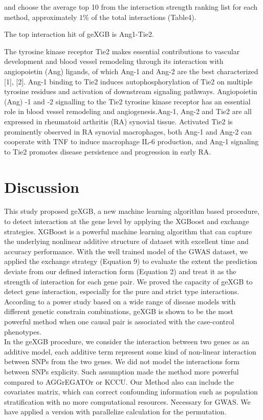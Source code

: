 \documentclass[11pt]{article}
\theoremstyle{plain}
\theoremstyle{definition}
\theoremstyle{remark}
\begin{document}
and choose the average top 10 from the interaction strength ranking list for each method, approximately $1\%$ of the total interactions (Table4).

The top interaction hit of geXGB is Ang1-Tie2.

The tyrosine kinase receptor Tie2 makes essential contributions to vascular development and blood vessel remodeling through its interaction with angiopoietin (Ang) ligands, of which Ang-1 and Ang-2 are the best characterized [1], [2]. Ang-1 binding to Tie2 induces autophosphorylation of Tie2 on multiple tyrosine residues and activation of downstream signaling pathways.
Angiopoietin (Ang) -1 and -2 signalling to the Tie2 tyrosine kinase receptor has an essential role in blood vessel remodeling and angiogenesis.Ang-1, Ang-2 and Tie2 are all expressed in rheumatoid arthritis (RA) synovial tissue. Activated Tie2 is prominently observed in RA synovial macrophages, both Ang-1 and Ang-2 can cooperate with TNF to induce macrophage IL-6 production, and Ang-1 signaling to Tie2 promotes disease persistence and progression in early RA.



\section{Discussion}

This study proposed geXGB, a new machine learning algorithm based procedure, to detect interaction at the gene level by applying the XGBoost and exchange strategies. XGBoost is a powerful machine learning algorithm that can capture the underlying nonlinear additive structure of dataset with excellent time and accuracy performance. With the well trained model of the GWAS dataset, we applied the exchange strategy (Equation 9) to evaluate the extent the prediction deviate from our defined interaction form (Equation 2) and treat it as the strength of interaction for each gene pair. We proved the capacity of geXGB to detect gene interaction, especially for the pure and strict type interactions. According to a power study based on a wide range of disease models with different genetic constrain combinations, geXGB is shown to be the most powerful method when one causal pair is associated with the case-control phenotypes.\\

\noindent In the geXGB procedure, we consider the interaction between two genes as an additive model, each additive term represent some kind of non-linear interaction between SNPs from the two genes. We did not model the interactions form between SNPs explicity. Such assumption made the method more powerful compared to AGGrEGATOr or KCCU. Our Method also can include the covariates matrix, which can correct confounding information such as population stratification with no more computational resources. Necessary for GWAS. We have applied a version with parallelize calculation for the permutation.\\
\end{document}
